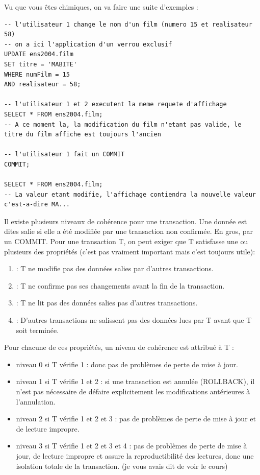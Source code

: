 \documentclass{report}
\begin{document}
Vu que vous êtes chimiques, on va faire une suite d'exemples :
\begin{lstlisting}[style=MySQLStyle]
-- l'utilisateur 1 change le nom d'un film (numero 15 et realisateur 58)
-- on a ici l'application d'un verrou exclusif
UPDATE ens2004.film
SET titre = 'MABITE'
WHERE numFilm = 15
AND realisateur = 58;

-- l'utilisateur 1 et 2 executent la meme requete d'affichage
SELECT * FROM ens2004.film;
-- A ce moment la, la modification du film n'etant pas valide, le titre du film affiche est toujours l'ancien

-- l'utilisateur 1 fait un COMMIT
COMMIT;

SELECT * FROM ens2004.film;
-- La valeur etant modifie, l'affichage contiendra la nouvelle valeur c'est-a-dire MA...
\end{lstlisting}
Il existe plusieurs niveaux de cohérence pour une transaction.
Une donnée est dites salie si elle a été modifiée par une transaction non confirmée. En gros, par un COMMIT. Pour une transaction T, on peut exiger que T satisfasse une ou plusieurs des propriétés (c'est pas vraiment important mais c'est toujours utile):
\begin{enumerate}
\item : T ne modifie pas des données salies par d'autres transactions.
\item : T ne confirme pas ses changements avant la fin de la transaction.
\item : T ne lit pas des données salies pas d'autres transactions.
\item : D'autres transactions ne salissent pas des données lues par T avant que T soit terminée.\\
\end{enumerate}
Pour chacune de ces propriétés, un niveau de cohérence est attribué à T :
\begin{itemize}
\item niveau 0 si T vérifie 1 : donc pas de problèmes de perte de mise à jour.
\item niveau 1 si T vérifie 1 et 2 : si une transaction est annulée (ROLLBACK), il n'est pas nécessaire de défaire explicitement les modifications antérieures à l'annulation.
\item niveau 2 si T vérifie 1 et 2 et 3 : pas de problèmes de perte de mise à jour et de lecture impropre.
\item niveau 3 si T vérifie 1 et 2 et 3 et 4 : pas de problèmes de perte de mise à jour, de lecture impropre et assure la reproductibilité des lectures, donc une isolation totale de la transaction. (je vous avais dit de voir le cours)\\
\end{itemize}
\end{document}
